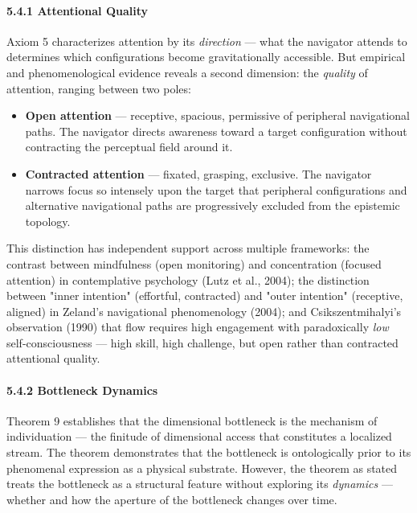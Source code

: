 \paragraph*{5.4.1 Attentional Quality}


Axiom 5 characterizes attention by its \textit{direction} — what the navigator attends to determines which configurations become gravitationally accessible. But empirical and phenomenological evidence reveals a second dimension: the \textit{quality} of attention, ranging between two poles:


\begin{itemize}[nosep,leftmargin=*]
  \item \textbf{Open attention} — receptive, spacious, permissive of peripheral navigational paths. The navigator directs awareness toward a target configuration without contracting the perceptual field around it.
  \item \textbf{Contracted attention} — fixated, grasping, exclusive. The navigator narrows focus so intensely upon the target that peripheral configurations and alternative navigational paths are progressively excluded from the epistemic topology.
\end{itemize}


This distinction has independent support across multiple frameworks: the contrast between mindfulness (open monitoring) and concentration (focused attention) in contemplative psychology (Lutz et al., 2004); the distinction between "inner intention" (effortful, contracted) and "outer intention" (receptive, aligned) in Zeland's navigational phenomenology (2004); and Csikszentmihalyi's observation (1990) that flow requires high engagement with paradoxically \textit{low} self-consciousness — high skill, high challenge, but open rather than contracted attentional quality.


\paragraph*{5.4.2 Bottleneck Dynamics}


Theorem 9 establishes that the dimensional bottleneck is the mechanism of individuation — the finitude of dimensional access that constitutes a localized stream. The theorem demonstrates that the bottleneck is ontologically prior to its phenomenal expression as a physical substrate. However, the theorem as stated treats the bottleneck as a structural feature without exploring its \textit{dynamics} — whether and how the aperture of the bottleneck changes over time.


